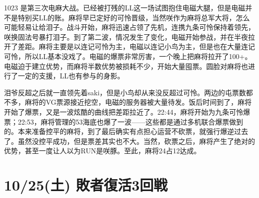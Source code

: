 1023 是第三次电麻大战。已经被打残的LL这一场试图抱住电磁大腿，但是电磁并不是特别买LL的账。麻将早已定好的可怜晋级，当然咲作为麻将总军大将，怎么可能轻易让给泪子。战斗开始，麻将迅速占领了先机，连携九条可怜保持着领先，咲换固法号暴打泪子。到了第二波，情况发生了变化，电磁开始参战，并在半夜拉开了差距。麻将主要是以连记可怜为主，电磁以连记小鸟为主，但是也在大量连记可怜，所以LL基本没戏了。电磁的爆票非常厉害，一个晚上把麻将拉开了100+。电磁迫于建立优势，而麻将半数优势被损耗不少，开始大量囤票。圆脸对麻将也进行了一定的支援，LL也有参与的身影。

泪爷反超之后就一直领先着saki，但是小鸟却从来没反超过可怜。两边的屯票数都不多，麻将的VG票源接近挖空，电磁的服务器被大量待发。饭后时间到了，麻将开始了爆票，又是一波炫酷的曲线把差距拉近了。22:44，麻将开始为九条可怜爆票；22:53，麻将管理的53海底也爆了一波——这些都是通过多机联合爆票做到的。本来准备控平的麻将，到了最后确实有点担心运营不砍票，就强行爆逆过去了。虽然没控平成功，但是票差其实也不大。当然，砍票之后，麻将产生了绝对的优势，甚至一度让人以为RUN是咲豚。至此，麻将24占12达成。

\section{10/25(土) 敗者復活3回戦}

